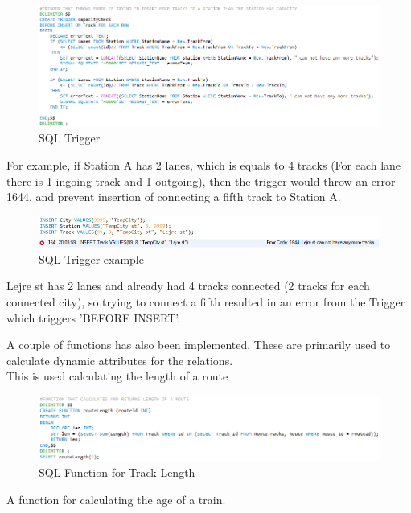 \begin{figure}[ht!]
    \centering
    \includegraphics[width=1\textwidth]{img/SQL_TRIGGER}
    \caption{SQL Trigger}
    \label{fig:ER}
\end{figure}

For example, if Station A has 2 lanes, which is equals to 4 tracks (For each lane there is 1 ingoing track and 1 outgoing), then the trigger would throw an error 1644, and prevent insertion of connecting a fifth track to Station A.

\begin{figure}[ht!]
    \centering
    \includegraphics[width=1\textwidth]{img/SQL_TRIGGER_example}
    \caption{SQL Trigger example}
    \label{fig:ER}
\end{figure}

Lejre st has 2 lanes and already had 4 tracks connected (2 tracks for each connected city), so trying to connect a fifth resulted in an error from the Trigger which triggers 'BEFORE INSERT'.

A couple of functions has also been implemented. These are primarily used to calculate dynamic attributes for the relations.\\
This is used calculating the length of a route

\begin{figure}[ht!]
    \centering
    \includegraphics[width=1\textwidth]{img/SQL_FUNCTION_Length}
    \caption{SQL Function for Track Length}
    \label{fig:ER}
\end{figure}
\newpage

A function for calculating the age of a train.


